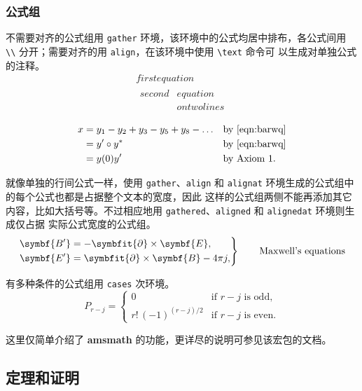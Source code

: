 \subsubsection{公式组}

不需要对齐的公式组用 \texttt{gather} 环境，该环境中的公式均居中排布，各公式间用
\verb|\\| 分开；需要对齐的用 \texttt{align}，在该环境中使用 \verb|\text| 命令可
以生成对单独公式的注释。
\begin{gather}
  first equation\\
  \begin{split}
    second & equation\\
           & on twolines
  \end{split}
\end{gather}

\begin{align}
 x & = y_1-y_2+y_3-y_5+y_8-\dots && \text{by \eqref{eqn:barwq}}\\
   & = y'\circ y^*               && \text{by \eqref{eqn:barwq}}\\
   & = y(0) y'                   && \text{by Axiom 1.}
\end{align}

就像单独的行间公式一样，使用 \texttt{gather}、\texttt{align} 和
\texttt{alignat} 环境生成的公式组中的每个公式也都是占据整个文本的宽度，因此
这样的公式组两侧不能再添加其它内容，比如大括号等。不过相应地用
\texttt{gathered}、\texttt{aligned} 和 \texttt{alignedat} 环境则生成仅占据
实际公式宽度的公式组。
\begin{equation*}
\left. \begin{aligned}
  \symbf{B'}&=-\symbfit{\partial}\times \symbf{E},\\
  \symbf{E'}&=\symbfit{\partial}\times \symbf{B} - 4\pi j,
\end{aligned}
\right\}
\qquad \text{Maxwell's equations}
\end{equation*}

有多种条件的公式组用 \texttt{cases} 次环境。
\[ P_{r-j}=\begin{cases}
  0& \text{if $r-j$ is odd},\\
  r!\,(-1)^{(r-j)/2}& \text{if $r-j$ is even}.
\end{cases} \]

这里仅简单介绍了 \textbf{amsmath} 的功能，更详尽的说明可参见该宏包的文档。

\subsection{定理和证明}

